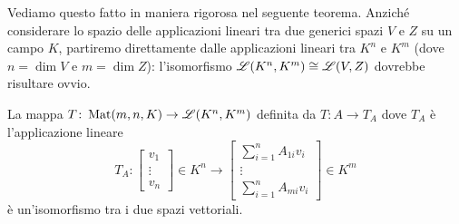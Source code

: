 Vediamo questo fatto in maniera rigorosa nel seguente teorema.
Anzich\'e considerare lo spazio delle applicazioni lineari tra due generici spazi $V$ e $Z$ su un campo $K$, partiremo direttamente dalle applicazioni lineari tra $K^n$ e $K^m$ (dove $n=\dim V$ e $m=\dim Z$): l'isomorfismo $\mathscr L(K^n,K^m)\cong\mathscr L(V,Z)$ dovrebbe risultare ovvio.
\begin{teorema} \label{t:matrice-associata}
	La mappa $T\colon\operatorname{Mat}(m,n,K)\to\mathscr L(K^n,K^m)$ definita da $T\colon A\to T_A$ dove $T_A$ è l'applicazione lineare
	\begin{equation}
		T_A\colon
		\begin{bmatrix}
			v_1\\
			\vdots\\
			v_n
		\end{bmatrix}
		\in K^n\to
		\begin{bmatrix}
			\sum_{i=1}^nA_{1i}v_i\\
			\vdots\\
			\sum_{i=1}^nA_{mi}v_i
		\end{bmatrix}
		\in K^m
		\label{eq:azione-applicazione-lineare-associata}
	\end{equation}
	è un'isomorfismo tra i due spazi vettoriali.
\end{teorema}
